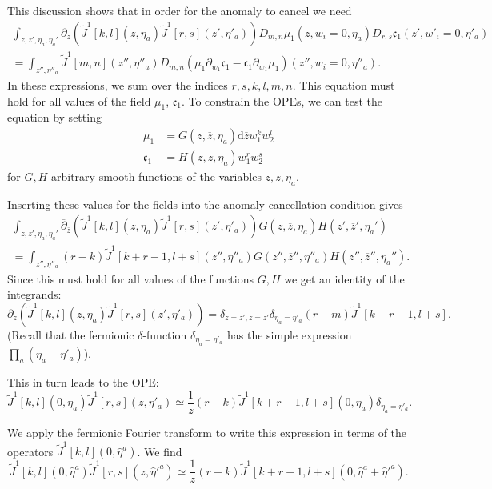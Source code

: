 \documentclass[11pt]{amsart}
\newcommand{\dbar}{\br{\partial}}
\newcommand{\zbar}{\br{z}}
\newcommand{\what}{\widehat}
\newcommand{\til}{\widetilde}
\newcommand{\br}{\overline}
\newcommand{\mf}{\mathfrak}
\renewcommand{\d}{\mathrm{d}}
\theoremstyle{thm}
\numberwithin{equation}{subsection}
\theoremstyle{def}
\theoremstyle{rem}
\begin{document}
This discussion shows that in order for the anomaly to cancel we need
\begin{multline} 
	\int_{z,z', \eta_a,\eta_a'} \dbar_{\zbar} \left( \til{J}^1[k,l] (z,\eta_a)  \til{J}^1[r,s] (z',\eta'_a) \right)  D_{m,n} \mu_1(z, w_i = 0, \eta_a)  D_{r,s}  \mf{c}_1 (z', w'_i = 0, \eta'_a)  \\
	= \int_{z'',\eta''_a} \til{J}^1[m,n] (z'',\eta''_a)  D_{m,n}\left( \mu_1 \partial_{w_1} \mf{c}_1   - \mf{c}_1 \partial_{w_1} \mu_1  \right)(z'',w_i = 0, \eta''_a).   
\end{multline}
In these expressions, we sum over the indices $r,s,k,l,m,n$.  This equation must hold for all values of the field $\mu_1$, $\mf{c}_1$. To constrain the OPEs, we can test the equation by setting 
\begin{align*}
\mu_1 & = G(z,\zbar,\eta_a) \d \zbar w_1^k w_2^l \\
\mf{c}_1 & = H(z,\zbar,\eta_a) w_1^r w_2^s
\end{align*}
for $G,H$ arbitrary smooth functions of the variables $z,\zbar,\eta_a$. 

Inserting these values for the fields into the anomaly-cancellation condition gives
\begin{multline} 
	\int_{z,z', \eta_a,\eta_a'} \dbar_{\zbar} \left( \til{J}^1[k,l] (z,\eta_a)  \til{J}^1[r,s] (z',\eta'_a) \right)  G(z,\zbar,\eta_a) H(z',\zbar',\eta_a') \\ 
	= \int_{z'',\eta''_a} (r-k)  \til{J}^1[k+r-1, l+s] (z'',\eta''_a)  G(z'',\zbar'',\eta''_a) H(z'',\zbar'', \eta_a'').
\end{multline}
Since this must hold for all values of the functions $G,H$ we get an identity of the integrands:
\[ 
	\dbar_{\zbar} \left( \til{J}^1[k, l] (z,\eta_a)  \til{J}^1[r,s] (z',\eta'_a) \right)  = \delta_{z = z',\br{z} = \br{z}'} \delta_{\eta_a = \eta'_a} (r-m) \til{J}^1[k + r -1, l+s] .  
\]
(Recall that the fermionic $\delta$-function $\delta_{\eta_a = \eta'_a}$ has the simple expression $\prod_a (\eta_a - \eta'_a)$).  

This in turn leads to the OPE:
\[ 
		\til{J}^1[k,l](0,\eta_a)  \til{J}^1[r,s](z,\eta'_a)  
	\simeq \frac{1}{z} (r-k)  \til{J}^1 [k+r-1,l+s] (0,\eta_a) \delta_{\eta_a = \eta'_a}. 
\]

We apply the fermionic Fourier transform to write this expression in terms of the operators $\til{J}^1[k,l] (0, \what{\eta}^a)$.
We find
\[ 
	\til{J}^1[k,l](0,\what{\eta}^a)  \til{J}^1[r,s](z,\what{\eta}'^{a})  
	\simeq \frac{1}{z} (r-k)  \til{J}^1 [k+r-1,l+s] (0,\what{\eta}^a + \what{\eta}'^{a} ). 
\]
\end{document}
